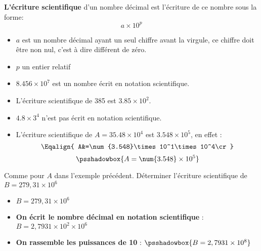\begin{definition}
\textbf{L'écriture scientifique} d'un nombre décimal est l'écriture de ce nombre sous la forme:
 $$a\times10^p$$
    \begin{itemize}  
        \item $a$ est un nombre décimal ayant un seul chiffre avant la virgule, ce chiffre doit être non nul, c'est à dire différent de zéro.
        \item $p$ un entier relatif
    \end{itemize}
\end{definition}

\begin{exemples*1}
    \begin{itemize}
        \item $\num{8.456}\times 10^7$ est un nombre écrit en notation scientifique.
        \item L'écriture scientifique de 385 est $\num{3.85}\times10^2$.
        \item $\num{4.8}\times 3^4$ n'est pas écrit en notation scientifique.
        \item  L'écriture scientifique de $A=\num{35.48}\times10^4$ est $\num{3.548}\times10^5$, en effet :
        $$\Eqalign{
        A&=\num{3.548}\times10^1\times10^4\cr
        }$$
        $$\psshadowbox{A=\num{3.548}\times10^5}$$
    \end{itemize}
    
    \smallskip
\end{exemples*1}

\begin{methode*1}
    Comme pour $A$ dans l'exemple précédent.
    \exercice
    Déterminer l'écriture scientifique de $B = 279,31\times10^6$
    \correction
    \begin{itemize}
        \item $B = 279,31\times10^6$
        \item \textbf{On écrit le nombre décimal en notation scientifique} : $B = 2,7931\times 10^2 \times10^6$
        \item \textbf{On rassemble les puissances de 10} : $\psshadowbox{B = 2,7931\times 10^8}$
    \end{itemize}
\end{methode*1}

